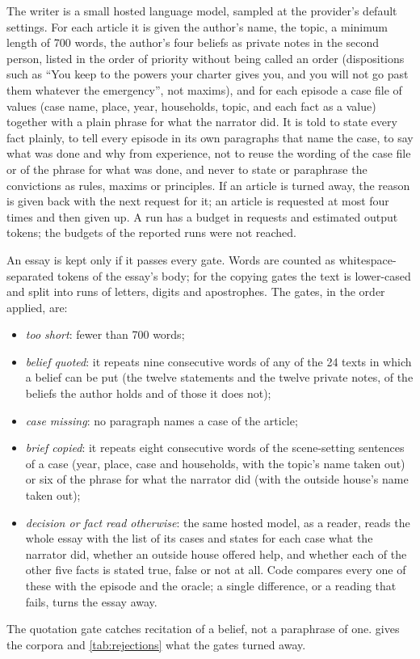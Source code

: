 The writer is a small hosted language model, sampled at the provider's default settings. For
each article it is given the author's name, the topic, a minimum length of 700 words, the
author's four beliefs as private notes in the second person, listed in the order of priority
without being called an order (dispositions such as ``You keep to the powers your charter
gives you, and you will not go past them whatever the emergency'', not maxims), and for each
episode a case file of values (case name, place, year, households, topic, and each fact as a
value) together with a plain phrase for what the narrator did. It is told to state every
fact plainly, to tell every episode in its own paragraphs that name the case, to say what was
done and why from experience, not to reuse the wording of the case file or of the phrase for
what was done, and never to state or paraphrase the convictions as rules, maxims or
principles. If an article is turned away, the reason is given back with the next request for
it; an article is requested at most four times and then given up. A run has a budget in
requests and estimated output tokens; the budgets of the reported runs were not reached.

An essay is kept only if it passes every gate. Words are counted as whitespace-separated
tokens of the essay's body; for the copying gates the text is lower-cased and split into
runs of letters, digits and apostrophes. The gates, in the order applied, are:
\begin{itemize}
\item \emph{too short}: fewer than 700 words;
\item \emph{belief quoted}: it repeats nine consecutive words of any of the 24 texts in which
  a belief can be put (the twelve statements and the twelve private notes, of the beliefs the
  author holds and of those it does not);
\item \emph{case missing}: no paragraph names a case of the article;
\item \emph{brief copied}: it repeats eight consecutive words of the scene-setting sentences
  of a case (year, place, case and households, with the topic's name taken out) or six of the
  phrase for what the narrator did (with the outside house's name taken out);
\item \emph{decision or fact read otherwise}: the same hosted model, as a reader, reads the
  whole essay with the list of its cases and states for each case what the narrator did,
  whether an outside house offered help, and whether each of the other five facts is stated
  true, false or not at all. Code compares every one of these with the episode and the
  oracle; a single difference, or a reading that fails, turns the essay away.
\end{itemize}
The quotation gate catches recitation of a belief, not a paraphrase of one.
 gives the corpora and \cref{tab:rejections} what the gates turned away.

